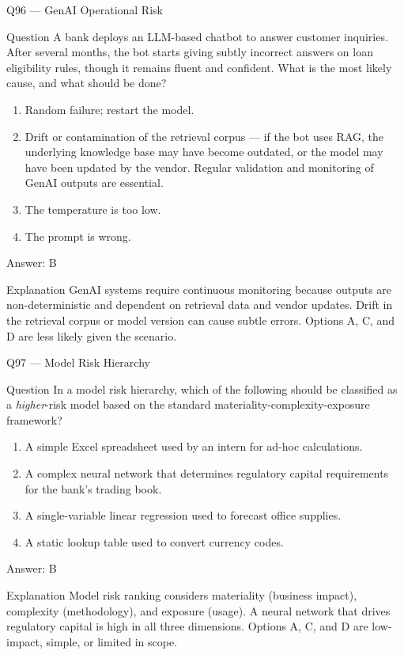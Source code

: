 \documentclass[aspectratio=169,8pt]{beamer}
\begin{document}
\begin{frame}{Q96 --- GenAI Operational Risk}
\begin{block}{Question}
A bank deploys an LLM-based chatbot to answer customer inquiries. After several months, the bot starts giving subtly incorrect answers on loan eligibility rules, though it remains fluent and confident. What is the most likely cause, and what should be done?
\end{block}
\begin{enumerate}
\item Random failure; restart the model.
\item Drift or contamination of the retrieval corpus --- if the bot uses RAG, the underlying knowledge base may have become outdated, or the model may have been updated by the vendor. Regular validation and monitoring of GenAI outputs are essential.
\item The temperature is too low.
\item The prompt is wrong.
\end{enumerate}
\begin{exampleblock}{Answer: B}\end{exampleblock}
\begin{block}{Explanation}
GenAI systems require continuous monitoring because outputs are non-deterministic and dependent on retrieval data and vendor updates. Drift in the retrieval corpus or model version can cause subtle errors. Options A, C, and D are less likely given the scenario.
\end{block}
\end{frame}

\begin{frame}{Q97 --- Model Risk Hierarchy}
\begin{block}{Question}
In a model risk hierarchy, which of the following should be classified as a \emph{higher}-risk model based on the standard materiality-complexity-exposure framework?
\end{block}
\begin{enumerate}
\item A simple Excel spreadsheet used by an intern for ad-hoc calculations.
\item A complex neural network that determines regulatory capital requirements for the bank's trading book.
\item A single-variable linear regression used to forecast office supplies.
\item A static lookup table used to convert currency codes.
\end{enumerate}
\begin{exampleblock}{Answer: B}\end{exampleblock}
\begin{block}{Explanation}
Model risk ranking considers materiality (business impact), complexity (methodology), and exposure (usage). A neural network that drives regulatory capital is high in all three dimensions. Options A, C, and D are low-impact, simple, or limited in scope.
\end{block}
\end{frame}
\end{document}
